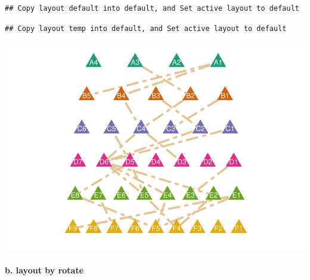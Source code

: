 \documentclass[
]{article}
\let\oldparagraph\paragraph
\renewcommand{\paragraph}[1]{\oldparagraph{#1}\mbox{}}
\begin{document}
\begin{verbatim}
## Copy layout default into default, and Set active layout to default
\end{verbatim}

\begin{verbatim}
## Copy layout temp into default, and Set active layout to default
\end{verbatim}

\includegraphics{ReadMe_files/figure-latex/unnamed-chunk-11-1.pdf}

\hypertarget{b.-layout-by-rotate}{%
\paragraph{b. layout by rotate}\label{b.-layout-by-rotate}}
\end{document}
